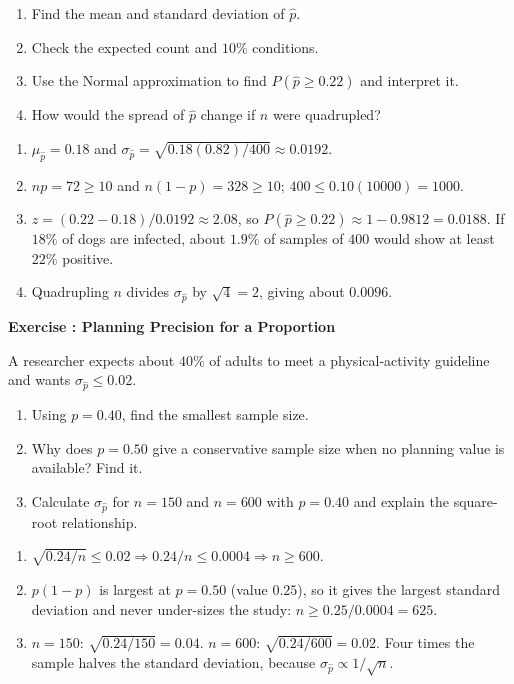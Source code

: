 \documentclass[11pt]{article}
\newcounter{exercise}
\newcommand{\exercise}[1]{%
  \par\medskip
  \refstepcounter{exercise}%
  {\large\bfseries\color{CourseBlue} Exercise \theexercise: #1}\par\smallskip}
\begin{document}
\begin{enumerate}
  \item Find the mean and standard deviation of $\hat p$.
  \item Check the expected count and $10\%$ conditions.
  \item Use the Normal approximation to find $P(\hat p\geq0.22)$ and interpret it.
  \item How would the spread of $\hat p$ change if $n$ were quadrupled?
\end{enumerate}

\begin{solution}
\begin{enumerate}
  \item $\mu_{\hat p}=0.18$ and $\sigma_{\hat p}=\sqrt{0.18(0.82)/400}\approx0.0192$.
  \item $np=72\geq10$ and $n(1-p)=328\geq10$; $400\leq0.10(10000)=1000$.
  \item $z=(0.22-0.18)/0.0192\approx2.08$, so $P(\hat p\geq0.22)\approx1-0.9812=0.0188$. If $18\%$ of dogs are infected, about $1.9\%$ of samples of $400$ would show at least $22\%$ positive.
  \item Quadrupling $n$ divides $\sigma_{\hat p}$ by $\sqrt4=2$, giving about $0.0096$.
\end{enumerate}
\end{solution}

\exercise{Planning Precision for a Proportion}

A researcher expects about $40\%$ of adults to meet a physical-activity guideline and wants $\sigma_{\hat p}\leq0.02$.

\begin{enumerate}
  \item Using $p=0.40$, find the smallest sample size.
  \item Why does $p=0.50$ give a conservative sample size when no planning value is available? Find it.
  \item Calculate $\sigma_{\hat p}$ for $n=150$ and $n=600$ with $p=0.40$ and explain the square-root relationship.
\end{enumerate}

\begin{solution}
\begin{enumerate}
  \item $\sqrt{0.24/n}\leq0.02 \Rightarrow 0.24/n\leq0.0004 \Rightarrow n\geq600$.
  \item $p(1-p)$ is largest at $p=0.50$ (value $0.25$), so it gives the largest standard deviation and never under-sizes the study: $n\geq0.25/0.0004=625$.
  \item $n=150$: $\sqrt{0.24/150}=0.04$. $n=600$: $\sqrt{0.24/600}=0.02$. Four times the sample halves the standard deviation, because $\sigma_{\hat p}\propto1/\sqrt n$.
\end{enumerate}
\end{solution}
\end{document}
